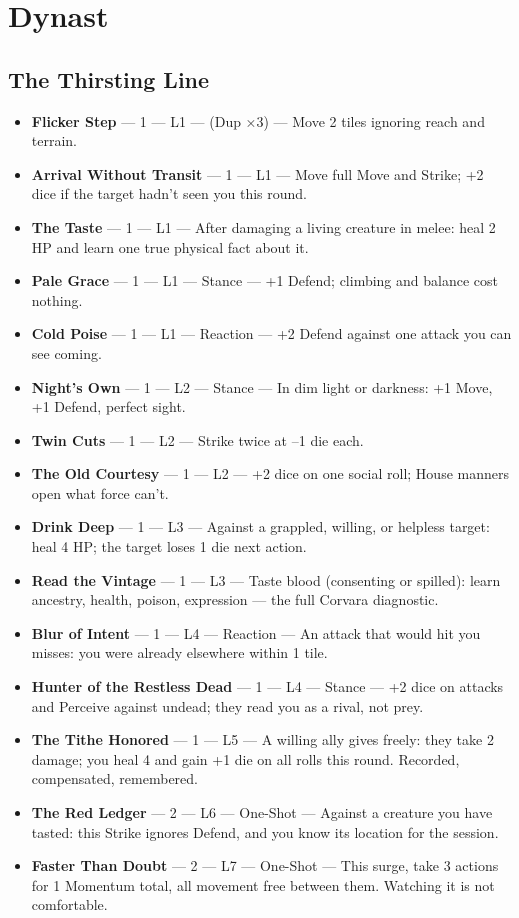 \section{Dynast}

\subsection{The Thirsting Line}
\begin{itemize}
    \item \textbf{Flicker Step} --- 1 --- L1 --- (Dup ×3) --- Move 2 tiles ignoring reach and terrain.
    \item \textbf{Arrival Without Transit} --- 1 --- L1 --- Move full Move and Strike; +2 dice if the target hadn't seen you this round.
    \item \textbf{The Taste} --- 1 --- L1 --- After damaging a living creature in melee: heal 2 HP and learn one true physical fact about it.
    \item \textbf{Pale Grace} --- 1 --- L1 --- Stance --- +1 Defend; climbing and balance cost nothing.
    \item \textbf{Cold Poise} --- 1 --- L1 --- Reaction --- +2 Defend against one attack you can see coming.
    \item \textbf{Night's Own} --- 1 --- L2 --- Stance --- In dim light or darkness: +1 Move, +1 Defend, perfect sight.
    \item \textbf{Twin Cuts} --- 1 --- L2 --- Strike twice at --1 die each.
    \item \textbf{The Old Courtesy} --- 1 --- L2 --- +2 dice on one social roll; House manners open what force can't.
    \item \textbf{Drink Deep} --- 1 --- L3 --- Against a grappled, willing, or helpless target: heal 4 HP; the target loses 1 die next action.
    \item \textbf{Read the Vintage} --- 1 --- L3 --- Taste blood (consenting or spilled): learn ancestry, health, poison, expression --- the full Corvara diagnostic.
    \item \textbf{Blur of Intent} --- 1 --- L4 --- Reaction --- An attack that would hit you misses: you were already elsewhere within 1 tile.
    \item \textbf{Hunter of the Restless Dead} --- 1 --- L4 --- Stance --- +2 dice on attacks and Perceive against undead; they read you as a rival, not prey.
    \item \textbf{The Tithe Honored} --- 1 --- L5 --- A willing ally gives freely: they take 2 damage; you heal 4 and gain +1 die on all rolls this round. Recorded, compensated, remembered.
    \item \textbf{The Red Ledger} --- 2 --- L6 --- One-Shot --- Against a creature you have tasted: this Strike ignores Defend, and you know its location for the session.
    \item \textbf{Faster Than Doubt} --- 2 --- L7 --- One-Shot --- This surge, take 3 actions for 1 Momentum total, all movement free between them. Watching it is not comfortable.
\end{itemize}

